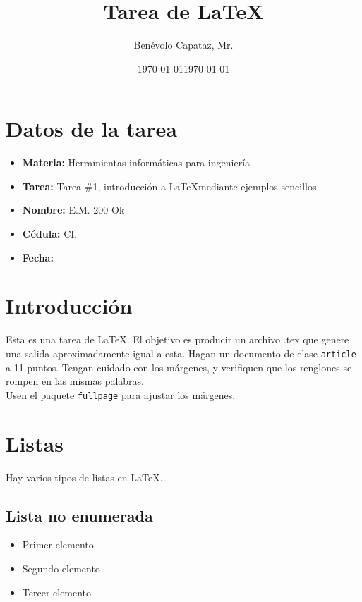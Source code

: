 \documentclass[11pt]{article}
\title{Tarea de \LaTeX}
\author{Benévolo Capataz, Mr.}
\date{\today}
\begin{document}
    \maketitle

    \section{\Large Datos de la tarea}
    
        \begin{itemize}
            \renewcommand{\labelitemi}{\tiny\raisebox{0.5ex}{{$\blacksquare$}}}
            
            \item \textbf{Materia:} Herramientas informáticas para ingeniería
            \item \textbf{Tarea:} Tarea \#1, introducción a \LaTeX mediante ejemplos sencillos
            \item \textbf{Nombre:} E.M. 200 Ok 
            \item \textbf{Cédula:} CI. 
            \item \textbf{Fecha:} \date{\today}  
            
        \end{itemize}

    \section{\Large Introducción} \vspace{-10pt}
        Esta es una tarea de \LaTeX. El objetivo es producir un archivo .tex que genere una salida
        aproximadamente igual a esta. Hagan un documento de clase {\tt article} a 11 puntos. Tengan
        cuidado con los márgenes, y verifiquen que los renglones se rompen en las mismas palabras.
        \\ [5pt]
        Usen el paquete {\tt fullpage} para ajustar los márgenes.


    \section{\Large Listas} \vspace{-10pt}
        Hay varios tipos de listas en \LaTeX.

        \subsection{\Large Lista no enumerada}
            \begin{itemize}[leftmargin=2cm]
                \renewcommand{\labelitemi}{\tiny\raisebox{0.5ex}{{$\blacksquare$}}}
                \item Primer elemento
                \item Segundo elemento
                \item Tercer elemento
            \end{itemize}
            
\end{document}
